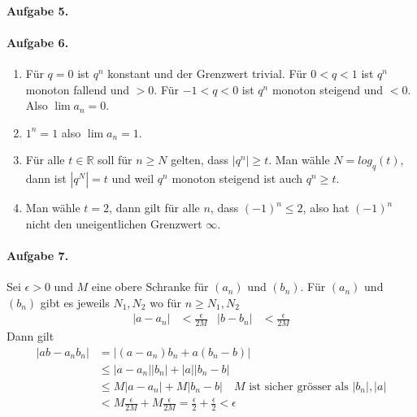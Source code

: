 \documentclass{article}
\begin{document}
\paragraph{Aufgabe 5.}

\paragraph{Aufgabe 6.}
\begin{enumerate}
    \item Für $q = 0$ ist $q^n$ konstant und der Grenzwert trivial. Für $0 < q < 1$ ist $q^n$ monoton fallend und $> 0$. Für $-1 < q < 0$ ist $q^n$ monoton steigend und $< 0$. Also $\lim a_n = 0$.
    
    \item $1^n = 1$ also $\lim a_n = 1$.
    
    \item Für alle $t \in \mathbb{R}$ soll für $n \geq N$ gelten, dass $|q^n| \geq t$. Man wähle $N = log_q(t)$, dann ist $|q^N| = t$ und weil $q^n$ monoton steigend ist auch $q^n \geq t$.
    
    \item Man wähle $t = 2$, dann gilt für alle $n$, dass $(-1)^n \leq 2$, also hat $(-1)^n$ nicht den uneigentlichen Grenzwert $\infty$.
\end{enumerate}

\paragraph{Aufgabe 7.} Sei $\epsilon > 0$ und $M$ eine obere Schranke für $(a_n)$ und $(b_n)$. Für $(a_n)$ und $(b_n)$ gibt es jeweils $N_1, N_2$ wo für $n \geq N_1, N_2$
\begin{align*}
    |a - a_n| &< \frac{\epsilon}{2M} & |b - b_n| &< \frac{\epsilon}{2M}
\end{align*}
Dann gilt
\begin{align*}
    |ab - a_nb_n| &= |(a - a_n)b_n + a(b_n - b)| \\
    &\leq |a - a_n||b_n| + |a||b_n - b| \\
    &\leq M|a - a_n| + M|b_n - b| \quad \text{$M$ ist sicher grösser als $|b_n|, |a|$} \\
    &< M\frac{\epsilon}{2M} + M\frac{\epsilon}{2M} = \frac{\epsilon}{2} + \frac{\epsilon}{2} < \epsilon
\end{align*}
\end{document}
